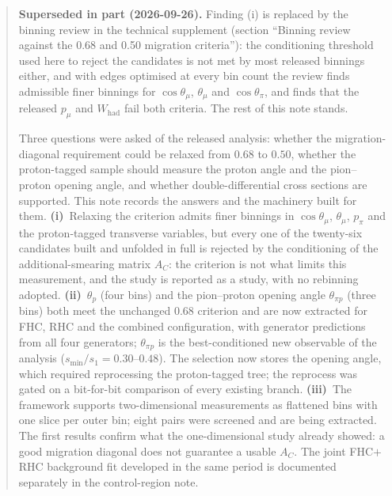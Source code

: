 \begin{titlepage}
\begin{abstract}
\textbf{Superseded in part (2026-09-26).} Finding (i) is replaced by the binning review in the technical
supplement (section ``Binning review against the 0.68 and 0.50 migration criteria''): the conditioning
threshold used here to reject the candidates is not met by most released binnings either, and with
edges optimised at every bin count the review finds admissible finer binnings for $\cos\theta_\mu$,
$\theta_\mu$ and $\cos\theta_\pi$, and finds that the released $p_\mu$ and $W_\mathrm{had}$ fail both
criteria. The rest of this note stands. \par\medskip
Three questions were asked of the released analysis: whether the migration-diagonal requirement
could be relaxed from $0.68$ to $0.50$, whether the proton-tagged sample should measure the proton
angle and the pion--proton opening angle, and whether double-differential cross sections are
supported. This note records the answers and the machinery built for them. \textbf{(i)}~Relaxing the
criterion admits finer binnings in $\cos\theta_\mu$, $\theta_\mu$, $p_\pi$ and the proton-tagged
transverse variables, but every one of the twenty-six candidates built and unfolded in full is
rejected by the conditioning of the additional-smearing matrix $A_C$: the criterion is not what
limits this measurement, and the study is reported as a study, with no rebinning adopted.
\textbf{(ii)}~$\theta_p$ (four bins) and the pion--proton opening angle $\theta_{\pi p}$ (three bins)
both meet the unchanged $0.68$ criterion and are now extracted for FHC, RHC and the combined
configuration, with generator predictions from all four generators; $\theta_{\pi p}$ is the
best-conditioned new observable of the analysis ($s_{\min}/s_1 = 0.30$--$0.48$). The selection now
stores the opening angle, which required reprocessing the proton-tagged tree; the reprocess was
gated on a bit-for-bit comparison of every existing branch. \textbf{(iii)}~The framework supports
two-dimensional measurements as flattened bins with one slice per outer bin; eight pairs were
screened and are being extracted. The first results confirm what the one-dimensional study
already showed: a good migration diagonal does not guarantee a usable $A_C$. The joint FHC$+$RHC
background fit developed in the same period is documented separately in the control-region note.
\end{abstract}
\end{titlepage}

\tableofcontents
\clearpage

